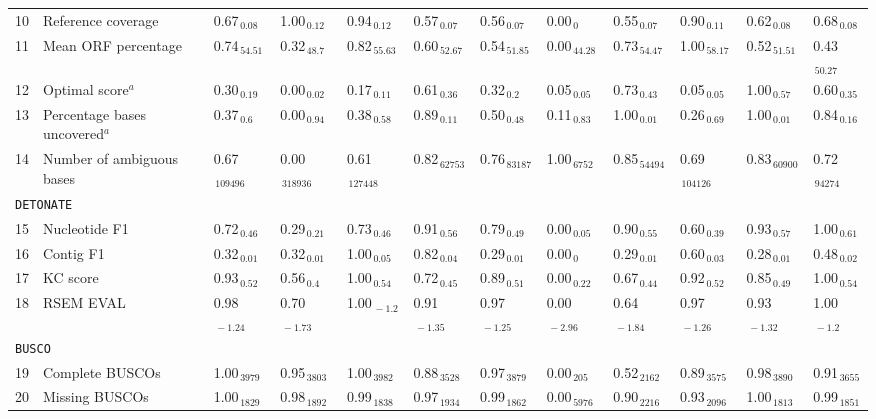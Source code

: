 \documentclass{scrartcl}
\begin{document}
\begin{landscape}
\begin{table}
\begin{scriptsize}
\begin{tabular}{llllllllllll}
10 & Reference coverage  & 0.67$_{\,0.08}$ & 1.00$_{\,0.12}$ & 0.94$_{\,0.12}$ & 0.57$_{\,0.07}$ & 0.56$_{\,0.07}$ & 0.00$_{\,0}$ & 0.55$_{\,0.07}$ & 0.90$_{\,0.11}$ & 0.62$_{\,0.08}$ & 0.68$_{\,0.08}$ \\11 & Mean ORF percentage  & 0.74$_{\,54.51}$ & 0.32$_{\,48.7}$ & 0.82$_{\,55.63}$ & 0.60$_{\,52.67}$ & 0.54$_{\,51.85}$ & 0.00$_{\,44.28}$ & 0.73$_{\,54.47}$ & 1.00$_{\,58.17}$ & 0.52$_{\,51.51}$ & 0.43$_{\,50.27}$ \\12 & Optimal score$^{a}$  & 0.30$_{\,0.19}$ & 0.00$_{\,0.02}$ & 0.17$_{\,0.11}$ & 0.61$_{\,0.36}$ & 0.32$_{\,0.2}$ & 0.05$_{\,0.05}$ & 0.73$_{\,0.43}$ & 0.05$_{\,0.05}$ & 1.00$_{\,0.57}$ & 0.60$_{\,0.35}$ \\13 & Percentage bases uncovered$^{a}$  & 0.37$_{\,0.6}$ & 0.00$_{\,0.94}$ & 0.38$_{\,0.58}$ & 0.89$_{\,0.11}$ & 0.50$_{\,0.48}$ & 0.11$_{\,0.83}$ & 1.00$_{\,0.01}$ & 0.26$_{\,0.69}$ & 1.00$_{\,0.01}$ & 0.84$_{\,0.16}$ \\14 & Number of ambiguous bases  & 0.67$_{\,109496}$ & 0.00$_{\,318936}$ & 0.61$_{\,127448}$ & 0.82$_{\,62753}$ & 0.76$_{\,83187}$ & 1.00$_{\,6752}$ & 0.85$_{\,54494}$ & 0.69$_{\,104126}$ & 0.83$_{\,60900}$ & 0.72$_{\,94274}$ \\\midrule
\multicolumn{11}{l}{\texttt{DETONATE}}\\ 
\midrule
15 & Nucleotide F1  & 0.72$_{\,0.46}$ & 0.29$_{\,0.21}$ & 0.73$_{\,0.46}$ & 0.91$_{\,0.56}$ & 0.79$_{\,0.49}$ & 0.00$_{\,0.05}$ & 0.90$_{\,0.55}$ & 0.60$_{\,0.39}$ & 0.93$_{\,0.57}$ & 1.00$_{\,0.61}$ \\16 & Contig F1  & 0.32$_{\,0.01}$ & 0.32$_{\,0.01}$ & 1.00$_{\,0.05}$ & 0.82$_{\,0.04}$ & 0.29$_{\,0.01}$ & 0.00$_{\,0}$ & 0.29$_{\,0.01}$ & 0.60$_{\,0.03}$ & 0.28$_{\,0.01}$ & 0.48$_{\,0.02}$ \\17 & KC score  & 0.93$_{\,0.52}$ & 0.56$_{\,0.4}$ & 1.00$_{\,0.54}$ & 0.72$_{\,0.45}$ & 0.89$_{\,0.51}$ & 0.00$_{\,0.22}$ & 0.67$_{\,0.44}$ & 0.92$_{\,0.52}$ & 0.85$_{\,0.49}$ & 1.00$_{\,0.54}$ \\18 & RSEM EVAL  & 0.98$_{\,-1.24}$ & 0.70$_{\,-1.73}$ & 1.00$_{\,-1.2}$ & 0.91$_{\,-1.35}$ & 0.97$_{\,-1.25}$ & 0.00$_{\,-2.96}$ & 0.64$_{\,-1.84}$ & 0.97$_{\,-1.26}$ & 0.93$_{\,-1.32}$ & 1.00$_{\,-1.2}$ \\\midrule
\multicolumn{11}{l}{\texttt{BUSCO}}\\ 
\midrule
19 & Complete BUSCOs  & 1.00$_{\,3979}$ & 0.95$_{\,3803}$ & 1.00$_{\,3982}$ & 0.88$_{\,3528}$ & 0.97$_{\,3879}$ & 0.00$_{\,205}$ & 0.52$_{\,2162}$ & 0.89$_{\,3575}$ & 0.98$_{\,3890}$ & 0.91$_{\,3655}$ \\20 & Missing BUSCOs  & 1.00$_{\,1829}$ & 0.98$_{\,1892}$ & 0.99$_{\,1838}$ & 0.97$_{\,1934}$ & 0.99$_{\,1862}$ & 0.00$_{\,5976}$ & 0.90$_{\,2216}$ & 0.93$_{\,2096}$ & 1.00$_{\,1813}$ & 0.99$_{\,1851}$ \\\midrule

\end{tabular}
\end{scriptsize}
\end{table}
\end{landscape}
\end{document}
